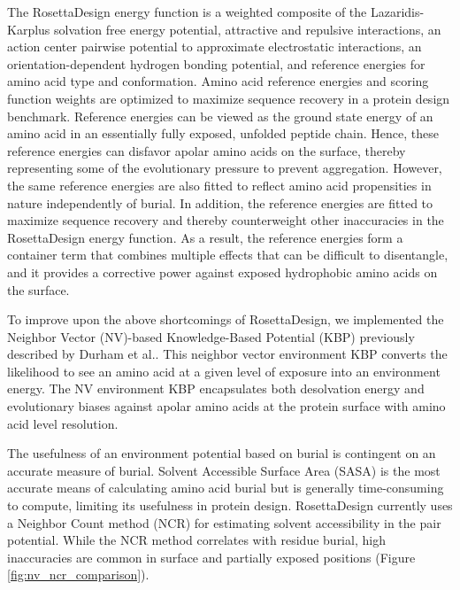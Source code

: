 The RosettaDesign energy function is a weighted composite of the Lazaridis-Karplus solvation free energy potential, attractive and repulsive interactions, an action center pairwise potential to approximate electrostatic interactions, an orientation-dependent hydrogen bonding potential\citep{Kortemme:2003td}, and reference energies for amino acid type and conformation\citep{Dantas:2003vt}. 
Amino acid reference energies and scoring function weights are optimized to maximize sequence recovery in a protein design benchmark.
Reference energies can be viewed as the ground state energy of an amino acid in an essentially fully exposed, unfolded peptide chain.
Hence, these reference energies can disfavor apolar amino acids on the surface, thereby representing some of the evolutionary pressure to prevent aggregation.
However, the same reference energies are also fitted to reflect amino acid propensities in nature independently of burial.
In addition, the reference energies are fitted to maximize sequence recovery and thereby counterweight other inaccuracies in the RosettaDesign energy function.
As a result, the reference energies form a container term that combines multiple effects that can be difficult to disentangle, and it provides a corrective power against exposed hydrophobic amino acids on the surface.

To improve upon the above shortcomings of RosettaDesign, we implemented the Neighbor Vector (NV)-based Knowledge-Based Potential (KBP) previously described by Durham et al.\citep{Durham:2009kt}.
This neighbor vector environment KBP converts the likelihood to see an amino acid at a given level of exposure into an environment energy.
The NV environment KBP encapsulates both desolvation energy and evolutionary biases against apolar amino acids at the protein surface with amino acid level resolution.

The usefulness of an environment potential based on burial is contingent on an accurate measure of burial.
Solvent Accessible Surface Area (SASA) is the most accurate means of calculating amino acid burial but is generally time-consuming to compute, limiting its usefulness in protein design.
RosettaDesign currently uses a Neighbor Count method (NCR) for estimating solvent accessibility in the pair potential.
While the NCR method correlates with residue burial, high inaccuracies are common in surface and partially exposed positions (Figure \ref{fig:nv_ncr_comparison}). 

